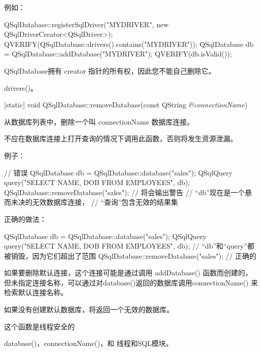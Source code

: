 例如：

\begin{cppcode}
QSqlDatabase::registerSqlDriver("MYDRIVER", new QSqlDriverCreator<QSqlDriver>);
QVERIFY(QSqlDatabase::drivers().contains("MYDRIVER"));
QSqlDatabase db = QSqlDatabase::addDatabase("MYDRIVER");
QVERIFY(db.isValid());
\end{cppcode}

QSqlDatabase拥有 creator 指针的所有权，因此您不能自己删除它。

\begin{seeAlso}
drivers()。
\end{seeAlso}

[static] void QSqlDatabase::removeDatabase(const QString \emph{\&connectionName})

从数据库列表中，删除一个叫 connectionName 数据库连接。

\begin{warning}
不应在数据库连接上打开查询的情况下调用此函数，否则将发生资源泄漏。
\end{warning}

\clearpage

例子：

\begin{cppcode}
// 错误
QSqlDatabase db = QSqlDatabase::database("sales");
QSqlQuery query("SELECT NAME, DOB FROM EMPLOYEES", db);
QSqlDatabase::removeDatabase("sales"); // 将会输出警告
// “db”现在是一个悬而未决的无效数据库连接，
// “查询”包含无效的结果集
\end{cppcode}


正确的做法：

\begin{cppcode}
{
    QSqlDatabase db = QSqlDatabase::database("sales");
    QSqlQuery query("SELECT NAME, DOB FROM EMPLOYEES", db);
}
// “db”和“query”都被销毁，因为它们超出了范围
QSqlDatabase::removeDatabase("sales"); // 正确的
\end{cppcode}

如果要删除默认连接，这个连接可能是通过调用 addDatabase() 函数而创建的，但未指定连接名称，可以通过对database()返回的数据库调用connectionName() 来检索默认连接名称。

\begin{notice}
如果没有创建默认数据库，将返回一个无效的数据库。
\end{notice}

\begin{notice}
这个函数是线程安全的
\end{notice}

\begin{seeAlso}
database()，connectionName()，和 线程和SQL模块。
\end{seeAlso}

